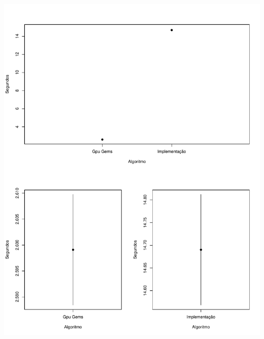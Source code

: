 \documentclass[a0paper,portrait]{baposter}
\begin{document}
\begin{poster}
{\begin{multicols*}{2}

\end{multicols*}
\begin{center}
\includegraphics[width=0.45\linewidth]{avg_sd_nbody.pdf}
\end{center}
}



\end{poster}
\end{document}
